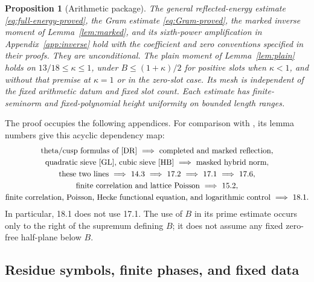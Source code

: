 \documentclass[12pt]{article}
\newtheorem{proposition}[theorem]{Proposition}
\begin{document}
\begin{proposition}[Arithmetic package]\label{prop:arithmetic}
The general reflected-energy estimate \eqref{eq:full-energy-proved},
the Gram estimate \eqref{eq:Gram-proved}, the marked inverse
moment of Lemma~\ref{lem:marked}, and its sixth-power amplification
in Appendix~\ref{app:inverse} hold with the coefficient and zero
conventions specified in their proofs.  They are unconditional.
The plain moment of Lemma~\ref{lem:plain} holds on
\(13/18\le\kappa\le1\), under \(B\le(1+\kappa)/2\) for
positive slots when \(\kappa<1\), and without that premise at
\(\kappa=1\) or in the zero-slot case.
Its mesh is independent of the fixed arithmetic datum and fixed
slot count.  Each estimate has finite-seminorm and fixed-polynomial
height uniformity on bounded length ranges.
\end{proposition}

The proof occupies the following appendices.  For comparison with
\cite{QRH}, its lemma numbers give this acyclic dependency map:
\[
\begin{gathered}
 \text{theta/cusp formulas of \cite{DR}}
 \ \Longrightarrow\ \text{completed and marked reflection},\\
 \text{quadratic sieve \cite{GL}, cubic sieve \cite{HB}}
 \ \Longrightarrow\ \text{masked hybrid norm},\\
 \text{these two lines}\ \Longrightarrow\ 14.3
 \ \Longrightarrow\ 17.2\ \Longrightarrow\ 17.1
 \ \Longrightarrow\ 17.6,\\
 \text{finite correlation and lattice Poisson}\ \Longrightarrow\ 15.2,\\
 \text{finite correlation, Poisson, Hecke functional equation,
 and logarithmic control}\ \Longrightarrow\ 18.1 .
\end{gathered}
\]
In particular, 18.1 does not use 17.1.  The use of \(B\) in its
prime estimate occurs only to the right of the supremum defining \(B\);
it does not assume any fixed zero-free half-plane below \(B\).

\subsection{Residue symbols, finite phases, and fixed data}
\end{document}
